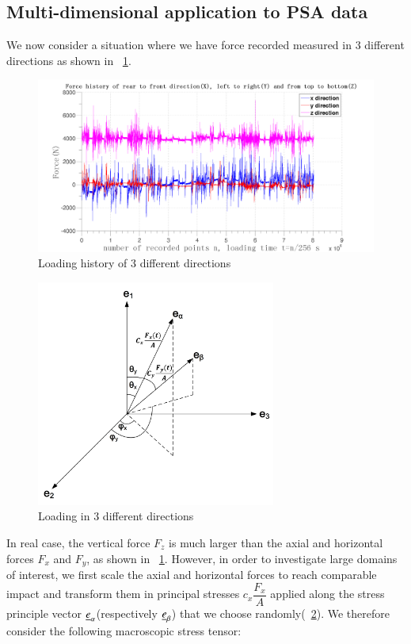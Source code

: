 \documentclass[3p,times,number,review]{elsarticle}
\newcommand{\figref}[1]{\figurename~\ref{#1}}
\begin{document}
 \newpage
 \subsection{Multi-dimensional application to PSA data}
 We now consider a situation where we have force recorded measured in 3 different directions as shown in \figref{xyz}.
 \begin{figure}[!h]
 	\centering
 	\includegraphics[width=\textwidth]{figures//xyz.png} 
 	\caption{Loading history of 3 different directions}
 	\label{xyz}
 \end{figure}
  \begin{figure}[!h]
  	\centering
  	\includegraphics[width=0.7\textwidth]{figures//xab.png} 
  	\caption{Loading in 3 different directions}
  	\label{xab}
  \end{figure}
 In real case, the vertical force $F_z$ is much larger than the axial and horizontal forces $F_x$ and $F_y$, as shown in \figref{xyz}. However, in order to investigate large domains of interest, we first scale the axial and horizontal forces to reach comparable impact and transform them in principal stresses $c_x\dfrac{F_x}{A}$ applied along the stress principle vector $\uline{e}_\alpha$(respectively $\uline{e}_\beta$) that we choose randomly(\figref{xab}). We therefore consider the following macroscopic stress tensor:
\end{document}
